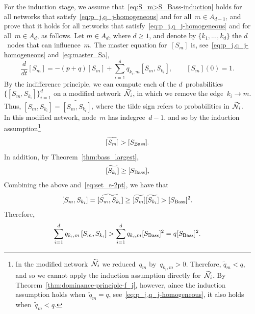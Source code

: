 \documentclass[review]{elsarticle}
\begin{document}
For the induction stage, we assume that~\eqref{eq:S_m>S_Bass-induction}
holds  for all networks 
that satisfy~\eqref{eq:p_j,q_j-homogeneous}  and for all~$m \in A_{d-1}$, and prove that it holds 
for all networks that satisfy~\eqref{eq:p_j,q_j-homogeneous}  and for all~$m \in A_{d}$, as follows. 
Let $m \in A_d$, where $d \ge 1$, and denote by 
$\{k_1,\ldots, k_{d}\}$ the $d$~nodes that can influence~$m$. 
The master equation for~$[S_m]$ is,
see~\eqref{eq:p_j,q_j-homogeneous} and~\eqref{eq:master_Sa}, 
\begin{equation}
	\label{eq:s^j_evolution_J+1}
	\frac{d}{dt}[S_m]= -(p+q)[S_m]
	+\sum_{i=1}^{d} q_{k_i,m}[S_m,S_{k_i}], \qquad [S_m](0)=1 .
\end{equation}
By the indifference principle, we can compute each of the $d$~probabilities $\{[S_m,S_{k_i}]\}_{i=1}^{d}$  on a modified network~$\widetilde{\cal N}_i$, in which we remove the edge~$k_i \rightarrow {m}$. Thus, $	[S_m,S_{k_i}] = \widetilde{[S_m,S_{k_i}]}$,  where the tilde sign refers to probabilities in~$\widetilde{\cal N}_i$. In this modified network, node~$m$ has indegree~$d-1$, and so by the induction assumption\footnote{In the modified network~$\widetilde{\cal N}_i$ we reduced~$q_m$ by~$q_{k_i,m}>0$. Therefore, $\widetilde{q}_m<q$,
	and so we cannot apply the induction assumption directly for~$\widetilde{\cal N}_i$.  
	By Theorem~\ref{thm:dominance-principle-f_j}, however,
	aince the induction assumption holds when~$\widetilde{q}_m=q$, 
	see~\eqref{eq:p_j,q_j-homogeneous}, it also holds when~$\widetilde{q}_m<q$.}
$$
\widetilde{[{S}_m]} > [S_{\rm Bass}]. 
$$
In addition, by Theorem~\ref{thm:bass_largest}, 
$$
\widetilde{[{S}_{k_i}]}  \ge  [S_{\rm Bass}], 
$$
Combining the above and~\eqref{eq:set_e-2pt},
we have that
$$
[S_m,S_{k_i}] = \widetilde{[S_m,S_{k_i}]} \ge \widetilde{[{S}_m]}\widetilde{[{S}_{k_i}]} >[S_{\rm Bass}]^2.
$$
Therefore, 
\begin{equation}
	\label{eq:s^js^i_indifference_J+1}
	\sum_{i=1}^{d} q_{k_i,m} \, [S_m,S_{k_i}] > \sum_{i=1}^{d} q_{k_i,m} [S_{\rm Bass}]^2 = q [S_{\rm Bass}]^2.
\end{equation}
\end{document}
